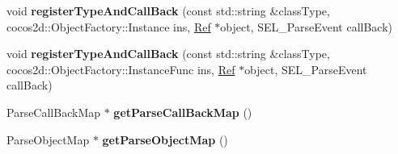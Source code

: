 \begin{DoxyCompactItemize}
\mbox{\label{classcocostudio_1_1GUIReader_ad0534296eedfb4a2d3e3adba48fb9850}} 
void {\bfseries register\+Type\+And\+Call\+Back} (const std\+::string \&class\+Type, cocos2d\+::\+Object\+Factory\+::\+Instance ins, \hyperlink{classRef}{Ref} $\ast$object, S\+E\+L\+\_\+\+Parse\+Event call\+Back)
\item 
\mbox{\label{classcocostudio_1_1GUIReader_a0a9154b9d7f3234c9be8f1dd9dcb16fd}} 
void {\bfseries register\+Type\+And\+Call\+Back} (const std\+::string \&class\+Type, cocos2d\+::\+Object\+Factory\+::\+Instance\+Func ins, \hyperlink{classRef}{Ref} $\ast$object, S\+E\+L\+\_\+\+Parse\+Event call\+Back)
\item 
\mbox{\label{classcocostudio_1_1GUIReader_a24578ecf812b642840fbc17ebf8131c4}} 
Parse\+Call\+Back\+Map $\ast$ {\bfseries get\+Parse\+Call\+Back\+Map} ()
\item 
\mbox{\label{classcocostudio_1_1GUIReader_a85fe9912947764b9e6d34956564d4887}} 
Parse\+Object\+Map $\ast$ {\bfseries get\+Parse\+Object\+Map} ()
\end{DoxyCompactItemize}
